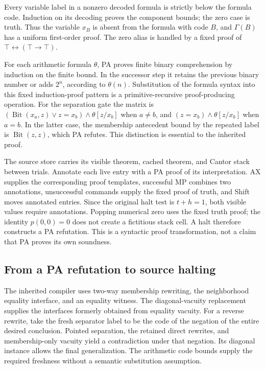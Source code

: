 \documentclass[11pt]{article}
\begin{document}
Every variable label in a nonzero decoded formula is strictly below the
formula code. Induction on its decoding proves the component bounds; the
zero case is truth. Thus the variable \(x_B\) is absent from the formula
with code \(B\), and \(\Gamma(B)\) has a uniform first-order proof.
The zero alias is handled by a fixed proof of
\(\top\leftrightarrow(\top\to\top)\).

For each arithmetic formula \(\theta\), PA proves finite binary
comprehension by induction on the finite bound. In the successor step it
retains the previous binary number or adds \(2^n\), according to
\(\theta(n)\). Substitution of the formula syntax into this fixed
induction-proof pattern is a primitive-recursive proof-producing operation.
For the separation gate the matrix is
\((\operatorname{Bit}(x_a,z)\lor z=x_b)\wedge\theta[z/x_b]\)
when \(a\ne b\), and \((z=x_b)\wedge\theta[z/x_b]\) when \(a=b\).
In the latter case, the membership antecedent bound by the repeated label
is \(\operatorname{Bit}(z,z)\), which PA refutes. This distinction is
essential to the inherited proof.

The source store carries its visible theorem, cached theorem, and Cantor
stack between trials. Annotate each live entry with a PA proof of its
interpretation. AX supplies the corresponding proof templates, successful
MP combines two annotations, unsuccessful commands supply the fixed proof
of truth, and Shift moves annotated entries. Since the original halt test
is \(t+h=1\), both visible values require annotations. Popping numerical
zero uses the fixed truth proof; the identity \(p(0,0)=0\) does not create
a fictitious stack cell. A halt therefore constructs a PA refutation.
This is a syntactic proof transformation, not a claim that PA proves its
own soundness.

\subsection{From a PA refutation to source halting}
The inherited compiler uses two-way membership rewriting, the neighborhood
equality interface, and an equality witness. The diagonal-vacuity
replacement supplies the interfaces formerly obtained from equality
vacuity. For a reverse rewrite, take the fresh separator label to be the
code of the negation of the entire desired conclusion. Pointed separation,
the retained direct rewrites, and membership-only vacuity yield a
contradiction under that negation. Its diagonal instance allows the final
generalization. The arithmetic code bounds supply the required freshness
without a semantic substitution assumption.
\end{document}
